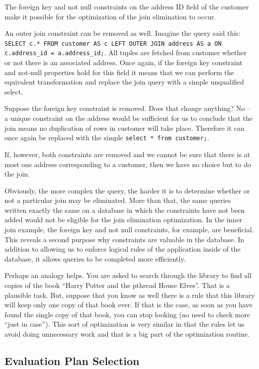 \documentclass[a4paper]{report}
\begin{document}
The foreign key and not null constraints on the address ID field of the customer make it possible for the optimization of the join elimination to occur.

An outer join constraint can be removed as well. Imagine the query said this: \texttt{SELECT c.* FROM customer AS c LEFT OUTER JOIN address AS a ON c.address\_id = a.address\_id;}. All tuples are fetched from customer whether or not there is an associated address. Once again, if the foreign key constraint and not-null properties hold for this field it means that we can perform the equivalent transformation and replace the join query with a simple unqualified select. 

Suppose the foreign key constraint is removed. Does that change anything? No -- a unique constraint on the address would be sufficient for us to conclude that the join means no duplication of rows in customer will take place. Therefore it can once again be replaced with the simple \texttt{select * from customer;}.

If, however, both constraints are removed and we cannot be sure that there is at most one address corresponding to a customer, then we have no choice but to do the join.

Obviously, the more complex the query, the harder it is to determine whether or not a particular join may be eliminated. More than that, the same queries written exactly the same on a database in which the constraints have not been added would not be eligible for the join elimination optimization. In the inner join example, the foreign key and not null constraints, for example, are beneficial. This reveals a second purpose why constraints are valuable in the database. In addition to allowing us to enforce logical rules of the application inside of the database, it allows queries to be completed more efficiently.

Perhaps an analogy helps. You are asked to search through the library to find all copies of the book ``Harry Potter and the pthread House Elves''. That is a plausible task. But, suppose that you know as well there is a rule that this library will keep only one copy of that book ever. If that is the case, as soon as you have found the single copy of that book, you can stop looking (no need to check more ``just in case''). This sort of optimization is very similar in that the rules let us avoid doing unnecessary work and that is a big part of the optimization routine.

\subsection*{Evaluation Plan Selection}
\end{document}
